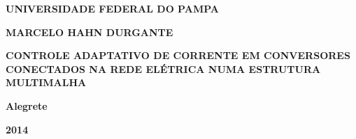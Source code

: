 \documentclass[12pt,
              openright,
              twoside,
              a4paper,
              english,
              french,
              spanish,
              sumario=tradicional,
              brazil
              ]{abntex2}
\renewcommand{\imprimircapa}{%
  \begin{capa}%
    \center
    \ABNTEXchapterfont\bfseries{UNIVERSIDADE FEDERAL DO PAMPA}

    \vspace*{5cm}

    {\ABNTEXchapterfont\bfseries{MARCELO HAHN DURGANTE}}

    \vspace*{3cm}

    \ABNTEXchapterfont\bfseries{CONTROLE ADAPTATIVO DE CORRENTE EM CONVERSORES CONECTADOS NA REDE ELÉTRICA NUMA ESTRUTURA MULTIMALHA}
    \vfill

    \normalsize\textbf{Alegrete}

    \par

    \normalsize\textbf{2014}

  \end{capa}
}
\begin{document}
\frenchspacing

\pretextual

\imprimircapa

\imprimirfolhaderosto*


%
%     
%
\begin{fichacatalografica}
  
\end{fichacatalografica}


%
% 
%
\begin{folhadeaprovacao}
  
\end{folhadeaprovacao}

\begin{dedicatoria}
  
\end{dedicatoria}

\begin{agradecimentos}
  
\end{agradecimentos}

\begin{epigrafe}
  
\end{epigrafe}
\end{document}
